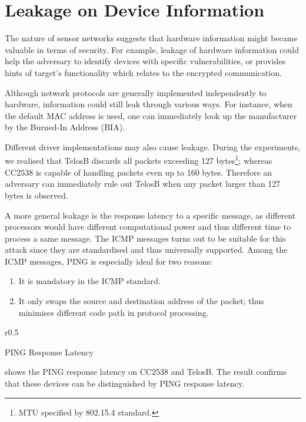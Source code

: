 \section{Leakage on Device Information}


The nature of sensor networks suggests that hardware information might became valuable in terms of security. For example, leakage of hardware information could help the adversary to identify devices with specific vulnerabilities, or provides hints of target's functionality which relates to the encrypted communication.

Although network protocols are generally implemented independently to hardware, information could still leak through various ways. For instance, when the default MAC address is used, one can immediately look up the manufacturer by the Burned-In Address (BIA)\cite{BIA}.

Different driver implementations may also cause leakage. During the experiments, we realised that TelosB\cite{TelosB} discards all packets exceeding 127 bytes\footnote{MTU specified by 802.15.4 standard.}; whereas CC2538 is capable of handling packets even up to 160 bytes. Therefore an adversary can immediately rule out TelosB when any packet larger than 127 bytes is observed.

A more general leakage is the response latency to a specific message, as different processors would have different computational power and thus different time to process a same message. The ICMP messages turns out to be suitable for this attack since they are standardised and thus universally supported. Among the ICMP messages, PING is especially ideal for two reasons: 
\begin{enumerate}
	\item It is mandatory in the ICMP standard.
	\item It only swaps the source and destination address of the packet; thus minimises different code path in protocol processing.
\end{enumerate}

\begin{table}{r}{0.5\textwidth}
	\center
	
	\caption{PING Response Latency\label{PingResponse}}
\end{table}

 shows the PING response latency on CC2538 and TelosB. The result confirms that these devices can be distinguished by PING response latency.


